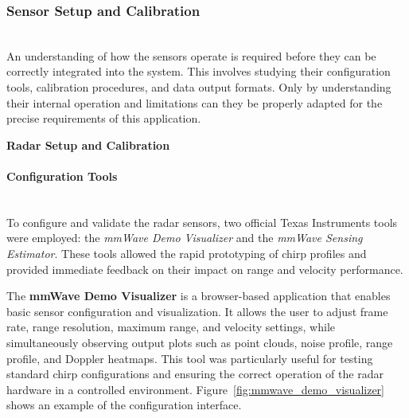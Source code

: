 \newpage
\subsubsection{Sensor Setup and Calibration}
\hfill
\\
\indent An understanding of how the sensors operate is required before they can be correctly integrated into the system.  
This involves studying their configuration tools, calibration procedures, and data output formats.  
Only by understanding their internal operation and limitations can they be properly adapted for the precise requirements of this application.

\vspace{0.5em}
\noindent\textbf{Radar Setup and Calibration}
\label{sec:radar_setup_calibration}
\vspace{0.5em}

\paragraph{Configuration Tools}
\hfill
\\
\indent To configure and validate the radar sensors, two official Texas Instruments tools were employed: the \textit{mmWave Demo Visualizer} and the \textit{mmWave Sensing Estimator}.  
These tools allowed the rapid prototyping of chirp profiles and provided immediate feedback on their impact on range and velocity performance.  

The \textbf{mmWave Demo Visualizer} \cite{mmwave_demo_web, mmwave_demo_doc} is a browser-based application that enables basic sensor configuration and visualization.  
It allows the user to adjust frame rate, range resolution, maximum range, and velocity settings, while simultaneously observing output plots such as point clouds, noise profile, range profile, and Doppler heatmaps.  
This tool was particularly useful for testing standard chirp configurations and ensuring the correct operation of the radar hardware in a controlled environment.  
Figure~\ref{fig:mmwave_demo_visualizer} shows an example of the configuration interface.  


